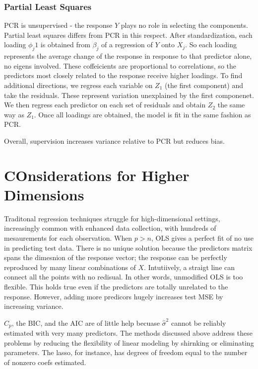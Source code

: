 \documentclass[
]{article}
\begin{document}
\hypertarget{partial-least-squares}{%
\subsubsection{Partial Least Squares}\label{partial-least-squares}}

PCR is unsupervised - the response \(Y\) plays no role in selecting the
components. Partial least squares differs from PCR in this respect.
After standardization, each loading \(\phi_j1\) is obtained from
\(\beta_j\) of a regression of \(Y\) onto \(X_j\). So each loading
represents the average change of the response in response to that
predictor alone, no eigens involved. These coffeicients are proportional
to correlations, so the predictors most closely related to the response
receive higher loadings. To find additional directions, we regress each
variable on \(Z_1\) (the first component) and take the residuals. These
represent variation unexplained by the first componenet. We then regress
each predictor on each set of residuals and obtain \(Z_2\) the same way
as \(Z_1\). Once all loadings are obtained, the model is fit in the same
fashion as PCR.

Overall, supervision increases variance relative to PCR but reduces
bias.

\hypertarget{considerations-for-higher-dimensions}{%
\section{COnsiderations for Higher
Dimensions}\label{considerations-for-higher-dimensions}}

Traditonal regression techniques struggle for high-dimensional settings,
increasingly common with enhanced data collection, with hundreds of
mesaurements for each observation. When \(p >n\), OLS gives a perfect
fit of no use in predicting test data. There is no unique solution
because the predictors matrix spans the dimesnion of the response
vector; the response can be perfectly reproduced by many linear
combinations of \(X\). Intutiively, a straigt line can connect all the
points with no redisual. In other words, unmodified OLS is too flexible.
This holds true even if the predictors are totally unrelated to the
response. However, adding more predicors hugely increases test MSE by
increasing variance.

\(C_p\), the BIC, and the AIC are of little help becuase
\(\hat\sigma^2\) cannot be reliably estimated with very many predictors.
The methods discussed above address these problems by reducing the
flexibility of linear modeling by shirnking or eliminating parameters.
The lasso, for instance, has degrees of freedom equal to the number of
nonzero coefs estimated.
\end{document}
